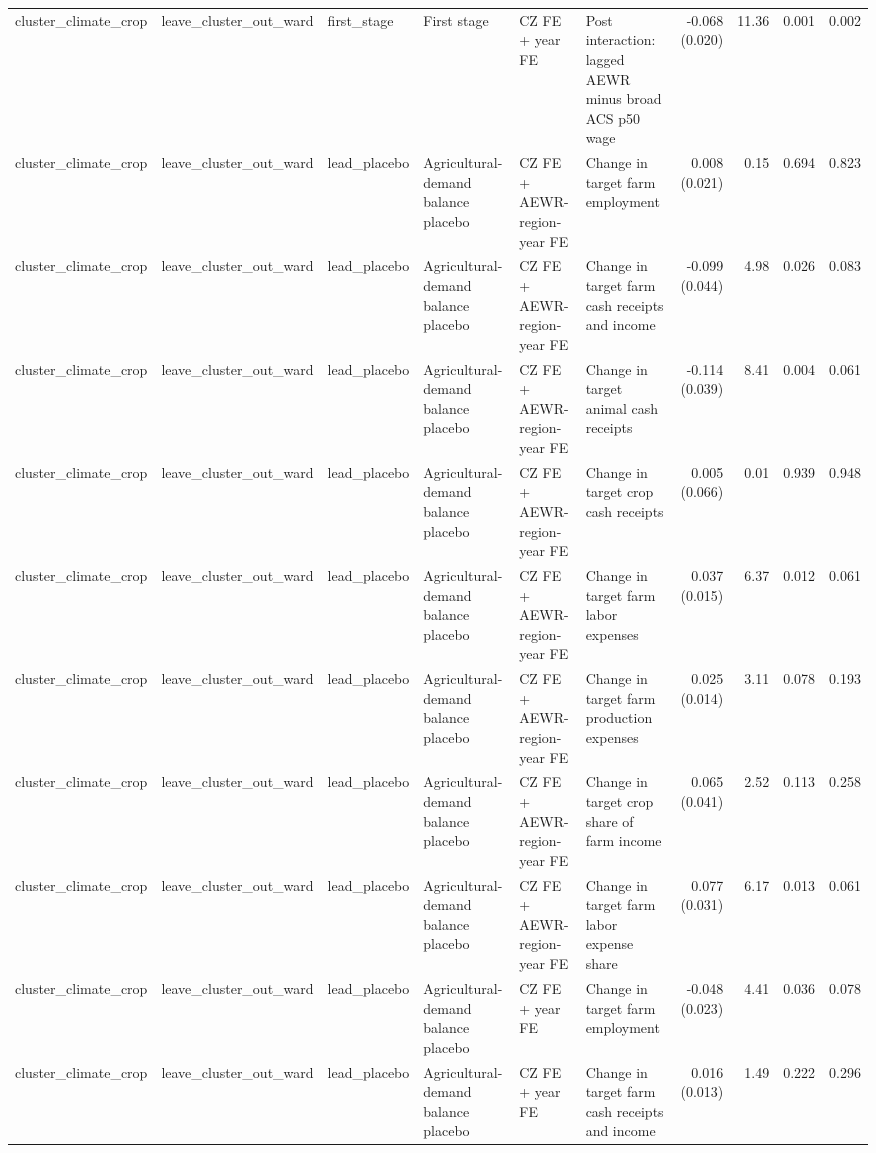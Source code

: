 \begin{tabular}{llllllrrrr}
cluster_climate_crop & leave_cluster_out_ward & first_stage & First stage & CZ FE + year FE & Post interaction: lagged AEWR minus broad ACS p50 wage & -0.068 (0.020) & 11.36 & 0.001 & 0.002 \\
cluster_climate_crop & leave_cluster_out_ward & lead_placebo & Agricultural-demand balance placebo & CZ FE + AEWR-region-year FE & Change in target farm employment & 0.008 (0.021) & 0.15 & 0.694 & 0.823 \\
cluster_climate_crop & leave_cluster_out_ward & lead_placebo & Agricultural-demand balance placebo & CZ FE + AEWR-region-year FE & Change in target farm cash receipts and income & -0.099 (0.044) & 4.98 & 0.026 & 0.083 \\
cluster_climate_crop & leave_cluster_out_ward & lead_placebo & Agricultural-demand balance placebo & CZ FE + AEWR-region-year FE & Change in target animal cash receipts & -0.114 (0.039) & 8.41 & 0.004 & 0.061 \\
cluster_climate_crop & leave_cluster_out_ward & lead_placebo & Agricultural-demand balance placebo & CZ FE + AEWR-region-year FE & Change in target crop cash receipts & 0.005 (0.066) & 0.01 & 0.939 & 0.948 \\
cluster_climate_crop & leave_cluster_out_ward & lead_placebo & Agricultural-demand balance placebo & CZ FE + AEWR-region-year FE & Change in target farm labor expenses & 0.037 (0.015) & 6.37 & 0.012 & 0.061 \\
cluster_climate_crop & leave_cluster_out_ward & lead_placebo & Agricultural-demand balance placebo & CZ FE + AEWR-region-year FE & Change in target farm production expenses & 0.025 (0.014) & 3.11 & 0.078 & 0.193 \\
cluster_climate_crop & leave_cluster_out_ward & lead_placebo & Agricultural-demand balance placebo & CZ FE + AEWR-region-year FE & Change in target crop share of farm income & 0.065 (0.041) & 2.52 & 0.113 & 0.258 \\
cluster_climate_crop & leave_cluster_out_ward & lead_placebo & Agricultural-demand balance placebo & CZ FE + AEWR-region-year FE & Change in target farm labor expense share & 0.077 (0.031) & 6.17 & 0.013 & 0.061 \\
cluster_climate_crop & leave_cluster_out_ward & lead_placebo & Agricultural-demand balance placebo & CZ FE + year FE & Change in target farm employment & -0.048 (0.023) & 4.41 & 0.036 & 0.078 \\
cluster_climate_crop & leave_cluster_out_ward & lead_placebo & Agricultural-demand balance placebo & CZ FE + year FE & Change in target farm cash receipts and income & 0.016 (0.013) & 1.49 & 0.222 & 0.296 \\

\end{tabular}
